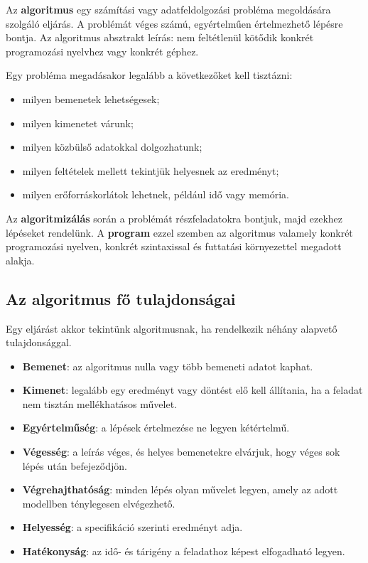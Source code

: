 Az \textbf{algoritmus} egy számítási vagy adatfeldolgozási probléma megoldására szolgáló eljárás. A problémát véges számú, egyértelműen értelmezhető lépésre bontja. Az algoritmus absztrakt leírás: nem feltétlenül kötődik konkrét programozási nyelvhez vagy konkrét géphez.

Egy probléma megadásakor legalább a következőket kell tisztázni:

\begin{itemize}
  \item milyen bemenetek lehetségesek;
  \item milyen kimenetet várunk;
  \item milyen közbülső adatokkal dolgozhatunk;
  \item milyen feltételek mellett tekintjük helyesnek az eredményt;
  \item milyen erőforráskorlátok lehetnek, például idő vagy memória.
\end{itemize}

Az \textbf{algoritmizálás} során a problémát részfeladatokra bontjuk, majd ezekhez lépéseket rendelünk. A \textbf{program} ezzel szemben az algoritmus valamely konkrét programozási nyelven, konkrét szintaxissal és futtatási környezettel megadott alakja.

\begin{center}

\end{center}

\subsection{Az algoritmus fő tulajdonságai}

Egy eljárást akkor tekintünk algoritmusnak, ha rendelkezik néhány alapvető tulajdonsággal.

\begin{itemize}
  \item \textbf{Bemenet}: az algoritmus nulla vagy több bemeneti adatot kaphat.
  \item \textbf{Kimenet}: legalább egy eredményt vagy döntést elő kell állítania, ha a feladat nem tisztán mellékhatásos művelet.
  \item \textbf{Egyértelműség}: a lépések értelmezése ne legyen kétértelmű.
  \item \textbf{Végesség}: a leírás véges, és helyes bemenetekre elvárjuk, hogy véges sok lépés után befejeződjön.
  \item \textbf{Végrehajthatóság}: minden lépés olyan művelet legyen, amely az adott modellben ténylegesen elvégezhető.
  \item \textbf{Helyesség}: a specifikáció szerinti eredményt adja.
  \item \textbf{Hatékonyság}: az idő- és tárigény a feladathoz képest elfogadható legyen.
\end{itemize}

